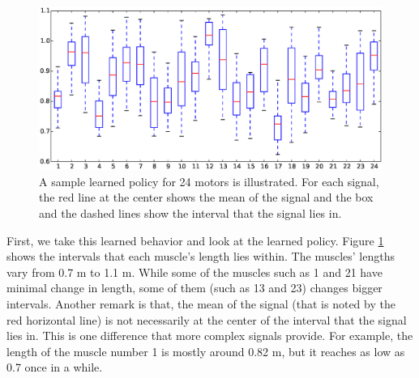 \documentclass[twocolumn,10pt]{asme2ej}
\begin{document}
\begin{figure}[t]
\centering
\includegraphics[width=\columnwidth]{results/signals/policy.eps}
\caption{A sample learned policy for 24 motors is illustrated. For each signal, the red line at the center shows the mean of the signal and the box and the dashed lines show the interval that the signal lies in.}
\label{fig:policy}
\end{figure}

First, we take this learned behavior and look at the learned policy. Figure \ref{fig:policy} shows the intervals that each muscle's length lies within.  The muscles' lengths vary from 0.7 m to 1.1 m. While some of the muscles such as 1 and 21 have minimal change in length, some of them (such as 13 and 23) changes bigger intervals. Another remark is that, the mean of the signal (that is noted by the red horizontal line) is not necessarily at the center of the interval that the signal lies in. This is one difference that more complex signals provide. For example, the length of the muscle number 1 is mostly around 0.82 m, but it reaches as low as 0.7 once in a while.
 
\end{document}
